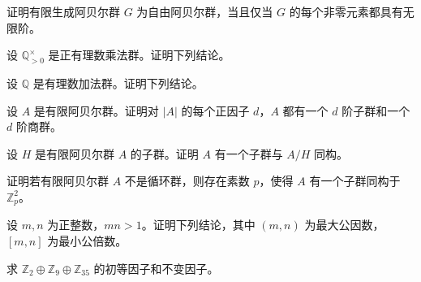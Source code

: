 \noindent\begin{minipage}{\textwidth}
证明有限生成阿贝尔群 $G$ 为自由阿贝尔群，当且仅当 $G$ 的每个非零元素都具有无限阶。
\end{minipage}\par\vfill
\newpage
\noindent\begin{minipage}{\textwidth}
设 $\mathbb Q_{>0}^\times$ 是正有理数乘法群。证明下列结论。
\end{minipage}\par\vfill
\noindent\begin{minipage}{\textwidth}
设 $\mathbb Q$ 是有理数加法群。证明下列结论。
\end{minipage}\par\vfill
\noindent\begin{minipage}{\textwidth}
设 $A$ 是有限阿贝尔群。证明对 $|A|$ 的每个正因子 $d$，$A$ 都有一个 $d$ 阶子群和一个 $d$ 阶商群。
\end{minipage}\par\vfill
\newpage
\noindent\begin{minipage}{\textwidth}
设 $H$ 是有限阿贝尔群 $A$ 的子群。证明 $A$ 有一个子群与 $A/H$ 同构。
\end{minipage}\par\vfill
\noindent\begin{minipage}{\textwidth}
证明若有限阿贝尔群 $A$ 不是循环群，则存在素数 $p$，使得 $A$ 有一个子群同构于 $\mathbb Z_p^2$。
\end{minipage}\par\vfill
\noindent\begin{minipage}{\textwidth}
设 $m,n$ 为正整数，$mn>1$。证明下列结论，其中 $(m,n)$ 为最大公因数，$[m,n]$ 为最小公倍数。
\end{minipage}\par\vfill
\newpage
\noindent\begin{minipage}{\textwidth}
求 $\mathbb Z_2\oplus\mathbb Z_9\oplus\mathbb Z_{35}$ 的初等因子和不变因子。
\end{minipage}\par\vfill
